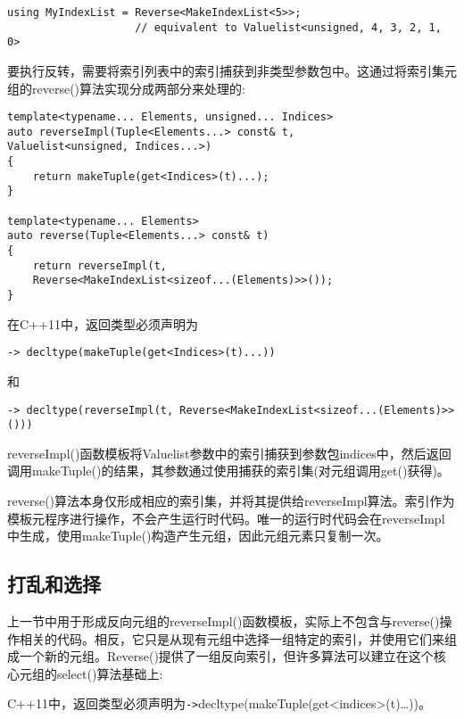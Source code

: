 \begin{lstlisting}[style=styleCXX]
using MyIndexList = Reverse<MakeIndexList<5>>;
					// equivalent to Valuelist<unsigned, 4, 3, 2, 1, 0>
\end{lstlisting}

要执行反转，需要将索引列表中的索引捕获到非类型参数包中。这通过将索引集元组的reverse()算法实现分成两部分来处理的:

\begin{lstlisting}[style=styleCXX]
template<typename... Elements, unsigned... Indices>
auto reverseImpl(Tuple<Elements...> const& t,
Valuelist<unsigned, Indices...>)
{
	return makeTuple(get<Indices>(t)...);
}

template<typename... Elements>
auto reverse(Tuple<Elements...> const& t)
{
	return reverseImpl(t,
	Reverse<MakeIndexList<sizeof...(Elements)>>());
}
\end{lstlisting}

在C++11中，返回类型必须声明为

\begin{lstlisting}[style=styleCXX]
-> decltype(makeTuple(get<Indices>(t)...))
\end{lstlisting}

和

\begin{lstlisting}[style=styleCXX]
-> decltype(reverseImpl(t, Reverse<MakeIndexList<sizeof...(Elements)>>()))
\end{lstlisting}

reverseImpl()函数模板将Valuelist参数中的索引捕获到参数包indices中，然后返回调用makeTuple()的结果，其参数通过使用捕获的索引集(对元组调用get()获得)。

reverse()算法本身仅形成相应的索引集，并将其提供给reverseImpl算法。索引作为模板元程序进行操作，不会产生运行时代码。唯一的运行时代码会在reverseImpl中生成，使用makeTuple()构造产生元组，因此元组元素只复制一次。

\subsection{打乱和选择}

上一节中用于形成反向元组的reverseImpl()函数模板，实际上不包含与reverse()操作相关的代码。相反，它只是从现有元组中选择一组特定的索引，并使用它们来组成一个新的元组。Reverse()提供了一组反向索引，但许多算法可以建立在这个核心元组的select()算法基础上:

\begin{tcolorbox}[colback=webgreen!5!white,colframe=webgreen!75!black]
\hspace*{0.75cm}C++11中，返回类型必须声明为\texttt{->}decltype(makeTuple(get<indices>(t)…))。
\end{tcolorbox}

